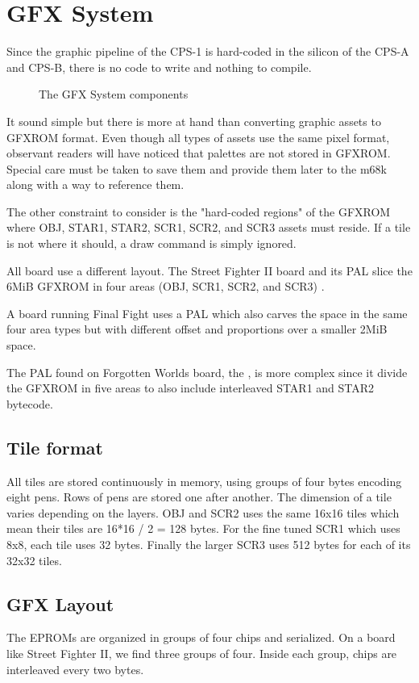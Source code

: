 \chapter{GFX System}
Since the graphic pipeline of the CPS-1 is hard-coded in the silicon of the CPS-A and CPS-B, there is no code to write and nothing to compile. 

\begin{figure}[H]
\caption*{The GFX System components}
\end{figure}

It sound simple but there is more at hand than converting graphic assets to GFXROM format. Even though all types of assets use the same pixel format, observant readers will have noticed that palettes are not stored in GFXROM. Special care must be taken to save them and provide them later to the m68k along with a way to reference them.

The other constraint to consider is the "hard-coded regions" of the GFXROM where OBJ, STAR1, STAR2, SCR1, SCR2, and SCR3 assets must reside. If a tile is not where it should, a draw command is simply ignored.

All board use a different layout. The Street Fighter II board and its  PAL slice the 6MiB GFXROM in four areas (OBJ, SCR1, SCR2, and SCR3) . 

A board running Final Fight uses a  PAL which also carves the space in the same four area types but with different offset and proportions over a smaller 2MiB space. 

The PAL found on Forgotten Worlds board, the , is more complex since it divide the GFXROM in five areas to also include interleaved STAR1 and STAR2 bytecode.


\section{Tile format}
All tiles are stored continuously in memory, using groups of four bytes encoding eight pens. Rows of pens are stored one after another. The dimension of a tile varies depending on the layers. OBJ and SCR2 uses the same 16x16 tiles which mean their tiles are 16*16 / 2 = 128 bytes. For the fine tuned SCR1 which uses 8x8, each tile uses 32 bytes. Finally the larger SCR3 uses 512 bytes for each of its 32x32 tiles.

\section{GFX Layout}
The EPROMs are organized in groups of four chips and serialized. On a board like Street Fighter II, we find three groups of four. Inside each group, chips are interleaved every two bytes.

